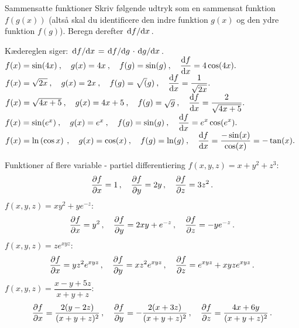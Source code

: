 \begin{opgave}[2]{Sammensatte funktioner}
Skriv følgende udtryk som en sammensat funktion $f(g(x))$ (altså skal du identificere den indre funktion $g(x)$ og den ydre funktion $f(g)$). Beregn derefter $\dv*{f}{x}$.

Kædereglen siger: $\dv*{f}{x}=\dv*{f}{g} \cdot \dv*{g}{x}$.
\opg $f(x) = \sin (4x)\:,~~~g(x)=4x\:,~~~f(g)=\sin(g)\:,~~~\displaystyle\dv{f}{x}=4\cos(4x).$
\opg $f(x) = \sqrt{2x}\:,~~~g(x)=2x\:,~~~f(g)=\sqrt(g)\:,~~~\displaystyle\dv{f}{x}=\dfrac{1}{\sqrt{2x}}.$
\opg $f(x) = \sqrt{4x+5}\:,~~~g(x)=4x+5\:,~~~f(g)=\sqrt{g}\:,~~~\displaystyle\dv{f}{x}=\frac{2}{\sqrt{4x+5}}.$
\opg $f(x) = \sin(e^x)\:,~~~g(x)=e^x\:,~~~f(g)=\sin(g)\:,~~~\displaystyle\dv{f}{x}=e^x\cos(e^x).$
\opg $f(x) =  \ln \left( \cos x \right)\:,~~~g(x)=\cos(x)\:,~~~f(g)=\ln(g)\:,~~~\displaystyle\dv{f}{x}=\dfrac{-\sin(x)}{\cos(x)}=-\tan(x).$
\end{opgave}
\begin{opgave}[3]{Funktioner af flere variable - partiel differentiering}
	\opg $f(x,y,z) = x+y^2+z^3$:
	\begin{align*}
	\pdv{f}{x} = 1 \, , \quad
	\pdv{f}{y} = 2y \, , \quad
	\pdv{f}{z} = 3z^2 \, .
	\end{align*}
	\opg $f(x,y,z)=xy^2+ye^{-z}$:
	\begin{align*}
	\pdv{f}{x} = y^2 \, , \quad
	\pdv{f}{y} = 2xy+e^{-z} \, , \quad
	\pdv{f}{z} = -ye^{-z} \, .
	\end{align*}
	\opg $f(x,y,z)=ze^{xyz}$:
	\begin{align*}
	\pdv{f}{x} = yz^2e^{xyz} \, , \quad
	\pdv{f}{y} = xz^2e^{xyz} \, , \quad
	\pdv{f}{z} = e^{xyz}+xyze^{xyz} \, .
	\end{align*}
	\opg $f(x,y,z) = \dfrac{x-y+5z}{x+y+z}$:
	\begin{align*}
	\pdv{f}{x} = \frac{2(y-2z)}{(x+y+z)^2} \, , \quad
	\pdv{f}{y} = -\frac{2(x+3z)}{(x+y+z)^2} \, , \quad
	\pdv{f}{z} = \frac{4x+6y}{(x+y+z)^2} \, .
	\end{align*}
\end{opgave}

